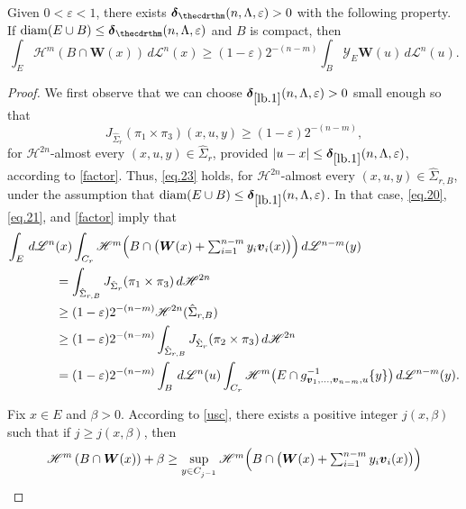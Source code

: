 \documentclass[JEP,XML,SOM,Unicode,ThmDefs,NoEqCountersInSection]{cedram}
\newcommand{\calH}{\mathscr{H}}
\newcommand{\calL}{\mathscr{L}}
\newcommand{\calY}{\mathscr{Y}}
\newcommand{\bdelta}{\boldsymbol{\delta}}
\newcommand{\bW}{{\boldsymbol{W}}}
\newcommand{\bv}{{\boldsymbol{v}}}
\DeclareMathOperator{\rmdiam}{\mathrm{diam}}
\let\veps\varepsilon
\begin{document}
\begin{Proposition}
\label{lb.1}
Given $0 < \veps < 1$, there exists $\bdelta_{\thecdrthm}(n,\Lambda,\veps) > 0$ with the following property.
If $\rmdiam (E \cup B) \leq \bdelta_{\thecdrthm}(n,\Lambda,\veps)$ and $B$ is compact, then
\begin{equation*}
\int_E \calH^m(B \cap \bW(x)) \,d\calL^n(x) \geq (1-\veps)2^{-(n-m)} \int_B \calY_E \bW(u) \,d\calL^n(u).
\end{equation*}
\end{Proposition}

\begin{proof}
We first observe that we can choose $\bdelta_{\ref{lb.1}}(n,\Lambda,\veps) > 0$ small enough so that
\begin{equation}
\label{eq.23}
J_{\hat{\Sigma}_r} (\pi_1 \times \pi_3)(x,u,y) \geq (1-\veps) 2^{-(n-m)},
\end{equation}
for $\calH^{2n}$-almost every $(x,u,y) \in \hat{\Sigma}_r$, provided $|u-x| \leq \bdelta_{\ref{lb.1}}(n,\Lambda,\veps)$, according to \ref{factor}.
Thus, \eqref{eq.23} holds, for $\calH^{2n}$-almost every $(x,u,y) \in \hat{\Sigma}_{r,B}$, under the assumption that $\rmdiam (E \cup B) \leq \bdelta_{\ref{lb.1}}(n,\Lambda,\veps)$.
In that case, \eqref{eq.20}, \eqref{eq.21}, and \ref{factor} imply that
\begin{align}
\int_E \,d\calL^n&(x) \int_{C_r} \textstyle\calH^m \Bigl(B \cap \bigl(\bW(x) + \sum_{i=1}^{n-m} y_i \bv_i(x) \bigr) \Bigr) \,d\calL^{n-m}(y)\notag \\
&= \int_{\hat{\Sigma}_{r,B}} J_{\hat{\Sigma}_r} (\pi_1 \times \pi_3) \,d\calH^{2n} \notag\\
& \geq (1-\veps)2^{-(n-m)} \calH^{2n}(\hat{\Sigma}_{r,B})\label{eq.25} \\
& \geq (1-\veps) 2^{-(n-m)}\int_{\hat{\Sigma}_{r,B}} J_{\hat{\Sigma}_r} (\pi_2 \times \pi_3) \,d\calH^{2n} \notag\\
& = (1-\veps) 2^{-(n-m)} \int_B \,d\calL^n(u) \int_{C_r} \calH^m \bigl(E \cap g_{\bv_1,\ldots,\bv_{n-m},u}^{-1}\{y\} \bigr)\,d\calL^{n-m}(y).\notag
\end{align}
\par
Fix $x \in E$ and $\beta > 0$.
According to \ref{usc}, there exists a positive integer $j(x,\beta)$ such that if $j \geq j(x,\beta)$, then
\begin{equation*}
\begin{split}
\calH^m \left(B \cap \bW(x) \right) + \beta & \geq \sup_{y \in C_{j^{-1}}}
\textstyle\calH^m \Bigl(B \cap \bigl(\bW(x) + \sum_{i=1}^{n-m} y_i \bv_i(x) \bigr) \Bigr) \\

\end{split}
\end{equation*}
\end{proof}
\end{document}
